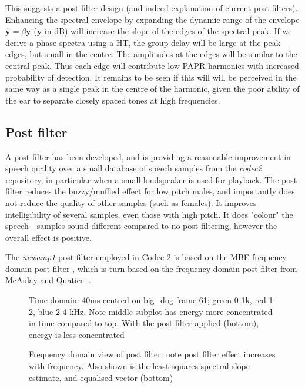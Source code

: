 \documentclass{article}
\begin{document}
This suggests a post filter design (and indeed explanation of current post filters).  Enhancing the spectral envelope by expanding the dynamic range of the envelope $\hat{\mathbf{y}}=\beta\mathbf{y}$ ($\mathbf{y}$ in dB) will increase the slope of the edges of the spectral peak.  If we derive a phase spectra using a HT, the group delay will be large at the peak edges, but small in the centre.  The amplitudes at the edges will be similar to the central peak.  Thus each edge will contribute low PAPR harmonics with increased probability of detection.  It remains to be seen if this will will be perceived in the same way as a single peak in the centre of the harmonic, given the poor ability of the ear to separate closely spaced tones at high frequencies.

\subsection{Post filter}

A post filter has been developed, and is providing a reasonable improvement in speech quality over a small database of speech samples from the \emph{codec2} repository, in particular when a small loudspeaker is used for playback. The post filter reduces the buzzy/muffled effect for low pitch males, and importantly does not reduce the quality of other samples (such as females). It improves intelligibility of several samples, even those with high pitch.  It does "colour" the speech - samples sound different compared to no post filtering, however the overall effect is positive. 

The \emph{newamp1} post filter employed in Codec 2 is based on the MBE frequency domain post filter \cite[Section 8.6, p 267]{kondoz1994digital}, which is turn based on the frequency domain post filter from McAulay and Quatieri \cite[Section 4.3, p 148]{kleijn1995speech}.

\begin{figure}[h]
\caption{Time domain: 40ms centred on big\_dog frame 61; green 0-1k, red 1-2, blue 2-4 kHz. Note middle subplot has energy more concentrated in time compared to top.  With the post filter applied (bottom), energy is less concentrated}
\label{fig:plphase2_big_dog_61_time}
\begin{center}

\end{center}
\end{figure}

\begin{figure}[h]
\caption{Frequency domain view of post filter: note post filter effect increases with frequency.  Also shown is the least squares spectral slope estimate, and equalised vector (bottom)}
\label{fig:plphase2_big_dog_61_freq}
\begin{center}

\end{center}
\end{figure}
\end{document}
